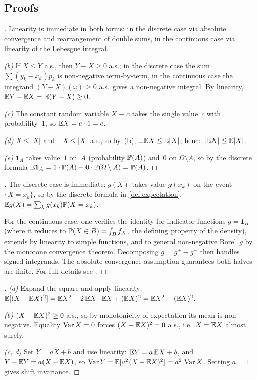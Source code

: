 \subsection*{Proofs}

\begin{proof}[]
Linearity is immediate in both forms: in the discrete case via
absolute convergence and rearrangement of double sums, in the
continuous case via linearity of the Lebesgue integral.

\emph{(b)} If $X \leq Y$ a.s., then $Y - X \geq 0$ a.s.; in the
discrete case the sum $\sum (y_k - x_k) p_k$ is non-negative
term-by-term, in the continuous case the integrand
$(Y - X)(\omega) \geq 0$ a.s.\ gives a non-negative integral. By
linearity, $\mathbb{E} Y - \mathbb{E} X = \mathbb{E}(Y - X) \geq 0$.

\emph{(c)} The constant random variable $X \equiv c$ takes the single
value~$c$ with probability~$1$, so $\mathbb{E} X = c \cdot 1 = c$.

\emph{(d)} $X \leq |X|$ and $-X \leq |X|$ a.s., so by~(b),
$\pm \mathbb{E} X \leq \mathbb{E} |X|$; hence $|\mathbb{E} X| \leq \mathbb{E} |X|$.

\emph{(e)} $\mathbf{1}_A$ takes value~$1$ on~$A$ (probability $\mathbb{P}(A)$)
and~$0$ on $\Omega \setminus A$, so by the discrete formula
$\mathbb{E} \mathbf{1}_A = 1 \cdot \mathbb{P}(A) + 0 \cdot \mathbb{P}(\Omega \setminus A) = \mathbb{P}(A)$.
\end{proof}

\begin{proof}[]
The discrete case is immediate: $g(X)$ takes value $g(x_k)$
on the event $\{X = x_k\}$, so by the discrete formula in
\cref{def:expectation}, $\mathbb{E} g(X) = \sum_k g(x_k) \mathbb{P}(X = x_k)$.

For the continuous case, one verifies the identity for indicator
functions $g = \mathbf{1}_B$ (where it reduces to
$\mathbb{P}(X \in B) = \int_B f_X$, the defining property of the density),
extends by linearity to simple functions, and to general
non-negative Borel~$g$ by the monotone convergence theorem.
Decomposing $g = g^+ - g^-$ then handles signed integrands. The
absolute-convergence assumption guarantees both halves are finite.
For full details see \cite[Ch.~II, \S~6]{Shiryaev1989}.
\end{proof}

\begin{proof}[]
\emph{(a)} Expand the square and apply linearity:
$\mathbb{E}[(X - \mathbb{E} X)^2] = \mathbb{E} X^2 - 2\, \mathbb{E} X \cdot \mathbb{E} X + (\mathbb{E} X)^2 = \mathbb{E} X^2 - (\mathbb{E} X)^2$.

\emph{(b)} $(X - \mathbb{E} X)^2 \geq 0$ a.s., so by monotonicity of expectation
its mean is non-negative. Equality $\operatorname{Var} X = 0$ forces
$(X - \mathbb{E} X)^2 = 0$ a.s., i.e.\ $X = \mathbb{E} X$ almost surely.

\emph{(c, d)} Set $Y = aX + b$ and use linearity:
$\mathbb{E} Y = a\, \mathbb{E} X + b$, and $Y - \mathbb{E} Y = a(X - \mathbb{E} X)$, so
$\operatorname{Var} Y = \mathbb{E}[a^2 (X - \mathbb{E} X)^2] = a^2\, \operatorname{Var} X$. Setting $a = 1$
gives shift invariance.
\end{proof}

